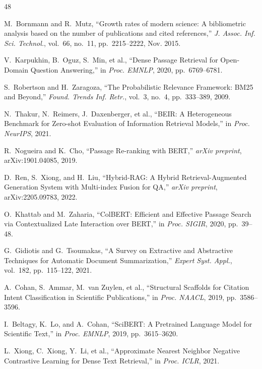 \documentclass[conference,10pt,twocolumn]{IEEEtran}
\begin{document}
\begin{thebibliography}{48}

M.~Bornmann and R.~Mutz, ``Growth rates of modern science: A bibliometric analysis based on the number of publications and cited references,'' \textit{J. Assoc. Inf. Sci. Technol.}, vol.~66, no.~11, pp.~2215--2222, Nov. 2015.

V.~Karpukhin, B.~Oguz, S.~Min, et al., ``Dense Passage Retrieval for Open-Domain Question Answering,'' in \textit{Proc. EMNLP}, 2020, pp.~6769--6781.

S.~Robertson and H.~Zaragoza, ``The Probabilistic Relevance Framework: BM25 and Beyond,'' \textit{Found. Trends Inf. Retr.}, vol.~3, no.~4, pp.~333--389, 2009.

N.~Thakur, N.~Reimers, J.~Daxenberger, et al., ``BEIR: A Heterogeneous Benchmark for Zero-shot Evaluation of Information Retrieval Models,'' in \textit{Proc. NeurIPS}, 2021.

R.~Nogueira and K.~Cho, ``Passage Re-ranking with BERT,'' \textit{arXiv preprint}, arXiv:1901.04085, 2019.

D.~Ren, S.~Xiong, and H.~Liu, ``Hybrid-RAG: A Hybrid Retrieval-Augmented Generation System with Multi-index Fusion for QA,'' \textit{arXiv preprint}, arXiv:2205.09783, 2022.

O.~Khattab and M.~Zaharia, ``ColBERT: Efficient and Effective Passage Search via Contextualized Late Interaction over BERT,'' in \textit{Proc. SIGIR}, 2020, pp.~39--48.

G.~Gidiotis and G.~Tsoumakas, ``A Survey on Extractive and Abstractive Techniques for Automatic Document Summarization,'' \textit{Expert Syst. Appl.}, vol.~182, pp.~115--122, 2021.

A.~Cohan, S.~Ammar, M.~van Zuylen, et al., ``Structural Scaffolds for Citation Intent Classification in Scientific Publications,'' in \textit{Proc. NAACL}, 2019, pp.~3586--3596.

I.~Beltagy, K.~Lo, and A.~Cohan, ``SciBERT: A Pretrained Language Model for Scientific Text,'' in \textit{Proc. EMNLP}, 2019, pp.~3615--3620.

L.~Xiong, C.~Xiong, Y.~Li, et al., ``Approximate Nearest Neighbor Negative Contrastive Learning for Dense Text Retrieval,'' in \textit{Proc. ICLR}, 2021.


\end{thebibliography}
\end{document}
